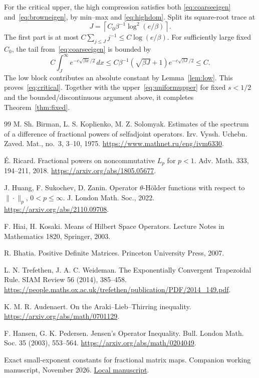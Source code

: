 \documentclass[11pt]{article}
\numberwithin{equation}{section}
\begin{document}
For the critical upper, the high compression satisfies both
\eqref{eq:coarseeigen} and~\eqref{eq:browneigen}, by min--max and
\eqref{eq:highdom}. Split its square-root trace at
\[
 J=\left\lceil C_0\beta^{-1}\log^2(e/\beta)\right\rceil.
\]
The first part is at most $C\sum_{j\le J}j^{-1}
\le C\log(e/\beta)$. For sufficiently large fixed $C_0$, the tail
from~\eqref{eq:coarseeigen} is bounded by
\[
 C\int_J^\infty e^{-c\sqrt{\beta x}/2}\,dx
 \le C\beta^{-1}(\sqrt{\beta J}+1)e^{-c\sqrt{\beta J}/2}
 \le C.
\]
The low block contributes an absolute constant by
Lemma~\ref{lem:low}. This proves~\eqref{eq:critical}.
Together with the upper~\eqref{eq:uniformupper} for fixed $s<1/2$
and the bounded/discontinuous argument above, it completes
Theorem~\ref{thm:fixed}.

\begin{thebibliography}{99}
M. Sh. Birman, L. S. Koplienko, M. Z. Solomyak.
Estimates of the spectrum of a difference of fractional powers of
selfadjoint operators. Izv. Vyssh. Uchebn. Zaved. Mat., no.~3,
3--10, 1975. \url{https://www.mathnet.ru/eng/ivm6330}.

\'E. Ricard. Fractional powers on noncommutative $L_p$ for $p<1$.
Adv. Math. 333, 194--211, 2018.
\url{https://arxiv.org/abs/1805.05677}.

J. Huang, F. Sukochev, D. Zanin. Operator $\theta$-H\"older functions
with respect to $\|\cdot\|_p$, $0<p\le\infty$.
J. London Math. Soc., 2022. \url{https://arxiv.org/abs/2110.09708}.

F. Hiai, H. Kosaki. Means of Hilbert Space Operators.
Lecture Notes in Mathematics 1820, Springer, 2003.

R. Bhatia. Positive Definite Matrices. Princeton University Press, 2007.

L. N. Trefethen, J. A. C. Weideman.
The Exponentially Convergent Trapezoidal Rule.
SIAM Review 56 (2014), 385--458.
\url{https://people.maths.ox.ac.uk/trefethen/publication/PDF/2014_149.pdf}.

K. M. R. Audenaert. On the Araki--Lieb--Thirring inequality.
\url{https://arxiv.org/abs/math/0701129}.

F. Hansen, G. K. Pedersen. Jensen's Operator Inequality.
Bull. London Math. Soc. 35 (2003), 553--564.
\url{https://arxiv.org/abs/math/0204049}.

Exact small-exponent constants for fractional matrix maps.
Companion working manuscript, November 2026.
\href{sharp-fractional-holder.pdf}{Local manuscript}.
\end{thebibliography}
\end{document}
